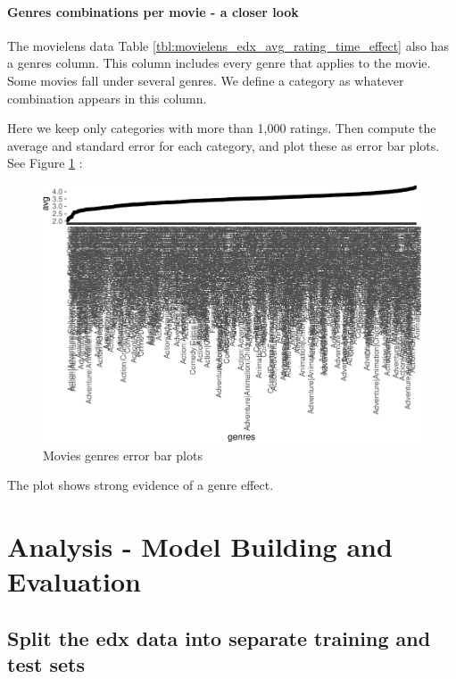 \documentclass[
]{article}
\begin{document}
\newpage

\hypertarget{genres-combinations-per-movie---a-closer-look}{%
\paragraph{Genres combinations per movie - a closer
look}\label{genres-combinations-per-movie---a-closer-look}}

The movielens data Table \ref{tbl:movielens_edx_avg_rating_time_effect}
also has a genres column. This column includes every genre that applies
to the movie. Some movies fall under several genres. We define a
category as whatever combination appears in this column.

Here we keep only categories with more than 1,000 ratings. Then compute
the average and standard error for each category, and plot these as
error bar plots. See Figure \ref{fig:genres_error_bar_plots} :

\begin{figure}
\centering
\includegraphics{figures/gnr-1.pdf}
\caption{Movies genres error bar
plots\label{fig:genres_error_bar_plots}}
\end{figure}

The plot shows strong evidence of a genre effect.

\newpage

\hypertarget{analysis---model-building-and-evaluation}{%
\section{Analysis - Model Building and
Evaluation}\label{analysis---model-building-and-evaluation}}

\hypertarget{split-the-edx-data-into-separate-training-and-test-sets}{%
\subsection{Split the edx data into separate training and test
sets}\label{split-the-edx-data-into-separate-training-and-test-sets}}
\end{document}
